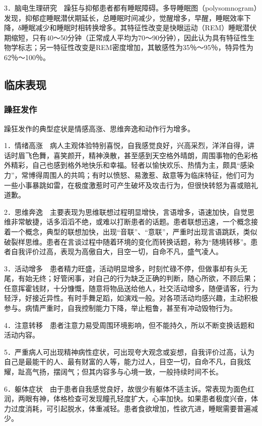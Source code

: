 3．脑电生理研究　躁狂与抑郁患者都有睡眠障碍。多导睡眠图（polysomnogram）发现，抑郁症睡眠潜伏期延长，总睡眠时间减少，觉醒增多，早醒，睡眠效率下降，δ睡眠减少和睡眠时相转换增多。其特征性改变是快眼运动（REM）睡眠潜伏期缩短，只有40～50分钟（正常成人平均为70～90分钟），因此认为具有特征性生物学标志；另一特征性改变是REM密度增加，其敏感性为35％～95％，特异性为62％～100％。

\subsection{临床表现}

\subsubsection{躁狂发作}

躁狂发作的典型症状是情感高涨、思维奔逸和动作行为增多。

1．情绪高涨　病人主观体验特别喜悦，自我感觉良好，兴高采烈，洋洋自得，讲话时眉飞色舞，喜笑颜开，精神涣散，甚至感到天空格外晴朗，周围事物的色彩格外精彩，自己也感到格外地快乐和幸福。轻者以愉快欢乐、热情为主，颇具“感染力”，常博得周围人的共鸣；有时以愤怒、易激惹、敌意等为临床特征，他们可为一些小事暴跳如雷，在极度激惹时可产生破坏及攻击行为，但很快转怒为喜或赔礼道歉。

2．思维奔逸　主要表现为思维联想过程明显增快，言语增多，语速加快，自觉思维非常敏捷，话多滔滔不绝，或难以打断患者的话题。患者联想迅速，一个概念接着一个概念，典型的联想加快，出现“音联”、“意联”，严重时出现言语跳跃，类似破裂样思维。患者在言谈过程中随着环境的变化而转换话题，称为“随境转移”。患者自我评价过高，表现为高傲自大，目空一切，自命不凡，盛气凌人。

3．活动增多　患者精力旺盛，活动明显增多，时刻忙碌不停，但做事却有头无尾，有始无终；好管闲事，对自己的行为缺乏正确的判断，随心所欲，不顾后果；任意挥霍钱财，十分慷慨，随意将物品送给他人，社交活动增多，随便请客，行为轻浮，好接近异性。有时手舞足蹈，如演戏一般。对各项活动均感兴趣，主动积极参与。病情严重时，自我控制能力下降，举止粗鲁，甚至有冲动毁物行为。

4．注意转移　患者注意力易受周围环境影响，但不能持久，所以不断变换话题和活动内容。

5．严重病人可出现精神病性症状，可出现夸大观念或妄想，自我评价过高，认为自己是最能干的人、最有财富的人等，能力过人，目空一切，自命不凡，自我炫耀，趾高气扬，摆阔气；但其内容多与心境一致，一般持续时间不长。

6．躯体症状　由于患者自我感觉良好，故很少有躯体不适主诉。常表现为面色红润，两眼有神，体格检查可发现瞳孔轻度扩大，心率加快。如果患者极度兴奋，体力过度消耗，可引起脱水，体重减轻。患者食欲增加，性欲亢进，睡眠需要普遍减少。

